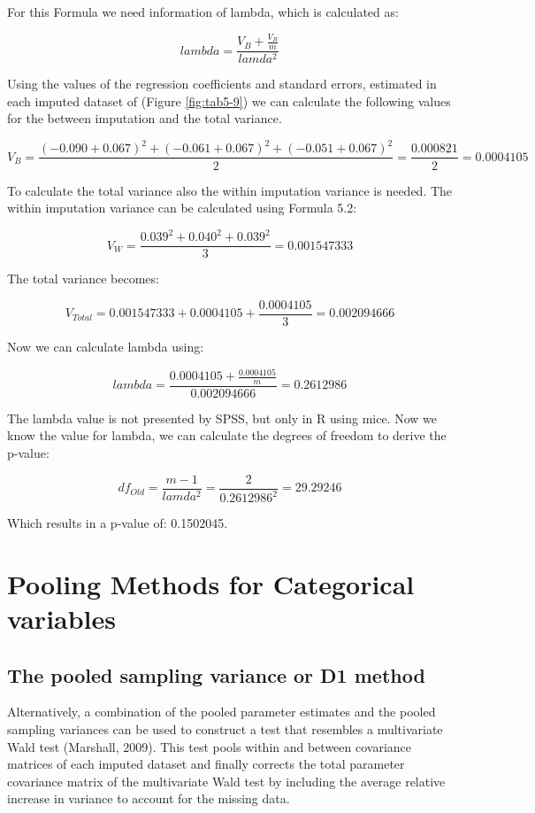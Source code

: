 \documentclass[]{book}
\begin{document}
For this Formula we need information of lambda, which is calculated as:

\[lambda = \frac{V_B + \frac{V_B}{m}}{lamda^2}\]

Using the values of the regression coefficients and standard errors,
estimated in each imputed dataset of (Figure \ref{fig:tab5-9}) we can
calculate the following values for the between imputation and the total
variance.

\[V_B= \frac{(-0.090+0.067)^2 + (-0.061+0.067)^2 +(-0.051+0.067)^2}{2}=\frac{0.000821}{2}=0.0004105\]

To calculate the total variance also the within imputation variance is
needed. The within imputation variance can be calculated using Formula
5.2:

\[V_W= \frac{0.039^2 + 0.040^2 + 0.039^2}{3}=0.001547333\]

The total variance becomes:

\[V_{Total} = 0.001547333+0.0004105+ \frac{0.0004105}{3}=0.002094666\]

Now we can calculate lambda using:

\[lambda = \frac{0.0004105 + \frac{0.0004105}{m}}{0.002094666}=0.2612986\]

The lambda value is not presented by SPSS, but only in R using mice. Now
we know the value for lambda, we can calculate the degrees of freedom to
derive the p-value:

\[df_{Old} = \frac{m-1}{lamda^2}=\frac{2}{0.2612986^2}=29.29246\]

Which results in a p-value of: 0.1502045.

\chapter{Pooling Methods for Categorical
variables}\label{pooling-methods-for-categorical-variables}

\section{The pooled sampling variance or D1
method}\label{the-pooled-sampling-variance-or-d1-method}

Alternatively, a combination of the pooled parameter estimates and the
pooled sampling variances can be used to construct a test that resembles
a multivariate Wald test (Marshall, 2009). This test pools within and
between covariance matrices of each imputed dataset and finally corrects
the total parameter covariance matrix of the multivariate Wald test by
including the average relative increase in variance to account for the
missing data.
\end{document}
